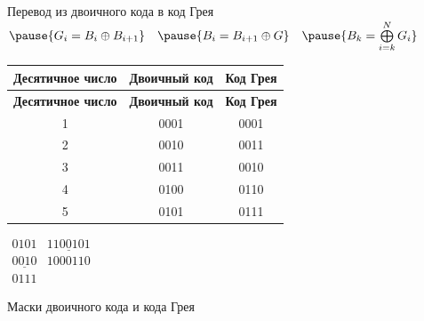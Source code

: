 \begin{frame}{Перевод из двоичного кода в код Грея}
    \centering
    $\begin{matrix}
        \pause{G_i = B_i \oplus B_{i+1}} & \pause{B_i = B_{i+1} \oplus G} & \pause{B_k = \bigoplus\limits_{i=k}^N G_i}
    \end{matrix}$

    \pause
    \begin{longtable}[c]{|c|c|c|}
        \hline
        \textbf{Десятичное число} & \textbf{Двоичный код} & \textbf{Код Грея}\\
        \hline
        \endfirsthead
        \hline
        \textbf{Десятичное число} & \textbf{Двоичный код} & \textbf{Код Грея}\\
        \hline
        \endhead
        1 & 0001 & 0001\\
        \hline
        2 & 0010 & 0011\\
        \hline
        3 & 0011 & 0010\\
        \hline
        4 & 0100 & 0110\\
        \hline
        5 & 0101 & 0111\\
        \hline
    \end{longtable}
    $\begin{matrix}
        0101 & \underline{1100101}\\
        \underline{0010} & 1000110\\
        0111
    \end{matrix}$

    \pause
    \large{Маски двоичного кода и кода Грея}

\end{frame}


